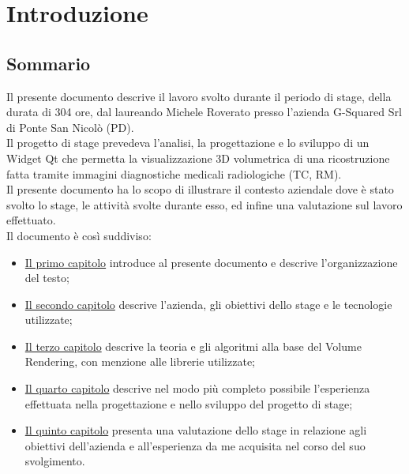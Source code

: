 
\chapter{Introduzione}
\label{cap:introduzione}

\section{Sommario}

Il presente documento descrive il lavoro svolto durante il periodo di stage, della durata di 304 ore, dal laureando Michele Roverato presso l'azienda G-Squared Srl di Ponte San Nicolò (PD).\\
Il progetto di stage prevedeva l'analisi, la progettazione e lo sviluppo di un Widget Qt che permetta la visualizzazione 3D volumetrica di una ricostruzione fatta tramite immagini diagnostiche medicali radiologiche (TC, RM).\\
Il presente documento ha lo scopo di illustrare il contesto aziendale dove è stato svolto lo stage, le attività svolte durante esso, ed infine una valutazione sul lavoro effettuato. \\
Il documento è così suddiviso:
\begin{itemize}
    \item \hyperref[cap:introduzione]{Il primo capitolo} introduce al presente documento e descrive l'organizzazione del testo;
    \item \hyperref[cap:descrizione-stage]{Il secondo capitolo} descrive l'azienda, gli obiettivi dello stage e le tecnologie utilizzate;
    \item \hyperref[cap:teoria-stage]{Il terzo capitolo} descrive la teoria e gli algoritmi alla base del Volume Rendering, con menzione alle librerie utilizzate;
    \item \hyperref[cap:resoconto-stage]{Il quarto capitolo} descrive nel modo più completo possibile l’esperienza effettuata nella progettazione e nello sviluppo del progetto di stage;
	\item \hyperref[cap:conclusioni]{Il quinto capitolo} presenta una valutazione dello stage in relazione agli obiettivi dell'azienda e all'esperienza da me acquisita nel corso del suo svolgimento.
\end{itemize}

